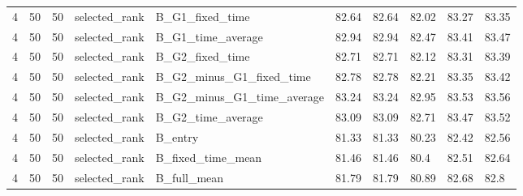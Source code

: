 \begin{longtable}{llllllllll}
4 & 50 & 50 & selected\_rank & B\_G1\_fixed\_time & 82.64 & 82.64 & 82.02 & 83.27 & 83.35 \\
4 & 50 & 50 & selected\_rank & B\_G1\_time\_average & 82.94 & 82.94 & 82.47 & 83.41 & 83.47 \\
4 & 50 & 50 & selected\_rank & B\_G2\_fixed\_time & 82.71 & 82.71 & 82.12 & 83.31 & 83.39 \\
4 & 50 & 50 & selected\_rank & B\_G2\_minus\_G1\_fixed\_time & 82.78 & 82.78 & 82.21 & 83.35 & 83.42 \\
4 & 50 & 50 & selected\_rank & B\_G2\_minus\_G1\_time\_average & 83.24 & 83.24 & 82.95 & 83.53 & 83.56 \\
4 & 50 & 50 & selected\_rank & B\_G2\_time\_average & 83.09 & 83.09 & 82.71 & 83.47 & 83.52 \\
4 & 50 & 50 & selected\_rank & B\_entry & 81.33 & 81.33 & 80.23 & 82.42 & 82.56 \\
4 & 50 & 50 & selected\_rank & B\_fixed\_time\_mean & 81.46 & 81.46 & 80.4 & 82.51 & 82.64 \\
4 & 50 & 50 & selected\_rank & B\_full\_mean & 81.79 & 81.79 & 80.89 & 82.68 & 82.8 \\
\bottomrule
\end{longtable}
\endgroup
